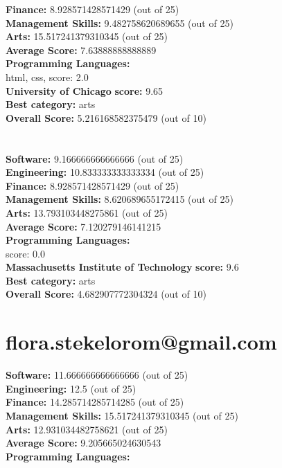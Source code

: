 \documentclass{article}
\begin{document}
\textbf{Finance:} 8.928571428571429 (out of 25)\\
\textbf{Management Skills:} 9.482758620689655 (out of 25)\\
\textbf{Arts:} 15.517241379310345 (out of 25)\\
\textbf{Average Score: } 7.63888888888889\\
\textbf{Programming Languages:} \\
html, css, score: 2.0\\
\textbf{University of Chicago} \textbf{score:} 9.65\\
\textbf{Best category: } arts\\
\textbf{Overall Score: }5.216168582375479 (out of 10)\section{}
\textbf{Software:} 9.166666666666666 (out of 25)\\
\textbf{Engineering: } 10.833333333333334 (out of 25)\\
\textbf{Finance:} 8.928571428571429 (out of 25)\\
\textbf{Management Skills:} 8.620689655172415 (out of 25)\\
\textbf{Arts:} 13.793103448275861 (out of 25)\\
\textbf{Average Score: } 7.120279146141215\\
\textbf{Programming Languages:} \\
score: 0.0\\
\textbf{Massachusetts Institute of Technology} \textbf{score:} 9.6\\
\textbf{Best category: } arts\\
\textbf{Overall Score: }4.682907772304324 (out of 10)\section{flora.stekelorom@gmail.com}
\textbf{Software:} 11.666666666666666 (out of 25)\\
\textbf{Engineering: } 12.5 (out of 25)\\
\textbf{Finance:} 14.285714285714285 (out of 25)\\
\textbf{Management Skills:} 15.517241379310345 (out of 25)\\
\textbf{Arts:} 12.931034482758621 (out of 25)\\
\textbf{Average Score: } 9.205665024630543\\
\textbf{Programming Languages:} \\
\end{document}
